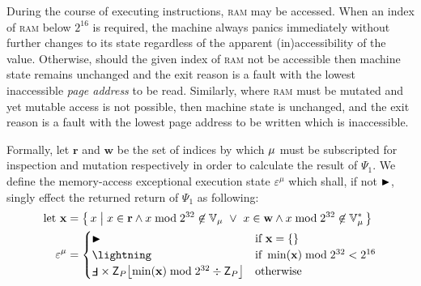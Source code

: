 During the course of executing instructions, \textsc{ram} may be accessed. When an index of \textsc{ram} below $2^{16}$ is required, the machine always panics immediately without further changes to its state regardless of the apparent (in)accessibility of the value. Otherwise, should the given index of \textsc{ram} not be accessible then machine state remains unchanged and the exit reason is a fault with the lowest inaccessible \emph{page address} to be read. Similarly, where \textsc{ram} must be mutated and yet mutable access is not possible, then machine state is unchanged, and the exit reason is a fault with the lowest page address to be written which is inaccessible.

Formally, let $\mathbf{r}$ and $\mathbf{w}$ be the set of indices by which ${\mu}$ must be subscripted for inspection and mutation respectively in order to calculate the result of $\Psi_1$. We define the memory-access exceptional execution state $\varepsilon^\mu$ which shall, if not $\blacktriangleright$, singly effect the returned return of $\Psi_1$ as following:
\begin{align}
  \using \mathbf{x} &= \set{\build{x}{x \in \mathbf{r} \wedge x \bmod 2^{32} \not\in \readable\mem\ \vee\ x \in \mathbf{w} \wedge x \bmod 2^{32} \not\in \writable\mem}} \\
  \varepsilon^\mu &= \begin{cases}
    \continue &\when \mathbf{x} = \emset \\
    \panic &\when \min(\mathbf{x}) \bmod 2^{32} < 2^{16} \\
    \fault \times \mathsf{Z}_P\floor{\min(\mathbf{x}) \bmod 2^{32} \div \mathsf{Z}_P} &\otherwise
  \end{cases}
\end{align}

